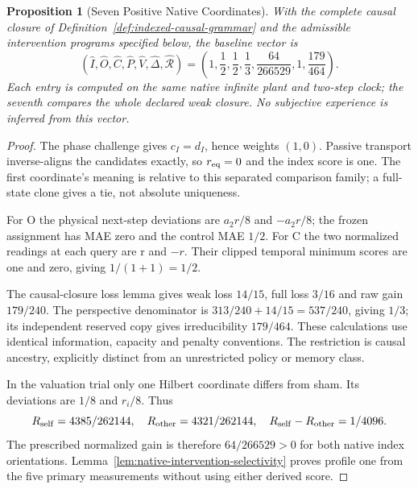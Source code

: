 \documentclass[11pt,a4paper]{article}
\newtheorem{proposition}[theorem]{Proposition}
\theoremstyle{definition}
\newcommand{\SelfIndex}{I}
\newcommand{\OwnField}{O}
\newcommand{\ContField}{C}
\newcommand{\Persp}{P}
\newcommand{\ValAsym}{V}
\newcommand{\IntervProf}{\Delta}
\newcommand{\Irred}{\mathcal{R}}
\begin{document}
\begin{proposition}[Seven Positive Native Coordinates]
\label{prop:native-seven-coordinates}
With the complete causal closure of Definition~\ref{def:indexed-causal-grammar}
and the admissible intervention programs specified below, the baseline vector is
\[
 (\widehat{\SelfIndex},\widehat{\OwnField},\widehat{\ContField},
  \widehat{\Persp},\widehat{\ValAsym},\widehat{\IntervProf},\widehat{\Irred})
 =\left(1,\frac12,\frac12,\frac13,\frac{64}{266529},1,\frac{179}{464}\right).
\]
Each entry is computed on the same native infinite plant and two-step clock;
the seventh compares the whole declared weak closure. No subjective experience
is inferred from this vector.
\end{proposition}
\begin{proof}
The phase challenge gives $c_I=d_I$, hence weights $(1,0)$. Passive transport
inverse-aligns the candidates exactly, so $r_{\rm eq}=0$ and the index score
is one. The first coordinate's meaning is relative to this separated
comparison family; a full-state clone gives a tie, not absolute uniqueness.

For O the physical next-step deviations are $a_2r/8$ and $-a_2r/8$;
the frozen assignment has MAE zero and the control MAE $1/2$. For C the
two normalized readings at each query are r and $-r$. Their clipped temporal
minimum scores are one and zero, giving $1/(1+1)=1/2$.

The causal-closure loss lemma gives weak loss $14/15$, full loss $3/16$
and raw gain $179/240$. The perspective denominator is
$313/240+14/15=537/240$, giving $1/3$; its independent reserved copy gives
irreducibility $179/464$. These calculations use identical information,
capacity and penalty conventions. The restriction is causal ancestry,
explicitly distinct from an unrestricted policy or memory class.

In the valuation trial only one Hilbert coordinate differs from sham.
Its deviations are $1/8$ and $r_i/8$. Thus
\[
 R_{\rm self}=4385/262144,\quad R_{\rm other}=4321/262144,
 \quad R_{\rm self}-R_{\rm other}=1/4096.
\]
The prescribed normalized gain is therefore $64/266529>0$ for both native
index orientations. Lemma~\ref{lem:native-intervention-selectivity} proves profile one
from the five primary measurements without using either derived score.
\end{proof}
\end{document}
